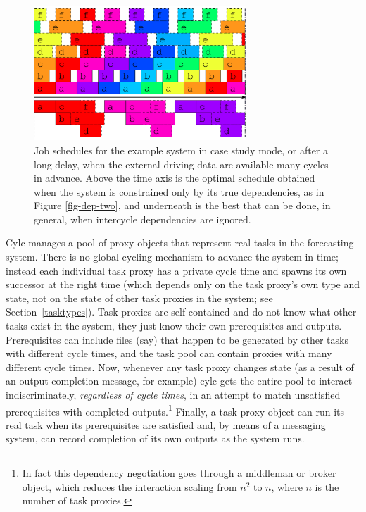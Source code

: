 \documentclass[11pt,a4paper]{article}
\begin{document}
\begin{figure} \label{fig-time-two}
    \begin{center} 
        \includegraphics[width=8cm]{inkscape-svg/timeline-two}
    \end{center} 
    \caption{\small Job schedules for the example system in case study
    mode, or after a long delay, when the external driving data are
    available many cycles in advance. Above the time axis is the optimal
    schedule obtained when the system is constrained only by its true
    dependencies, as in Figure \ref{fig-dep-two}, and underneath is
    the best that can be done, in general, when intercycle dependencies
    are ignored.} 
\end{figure} 

Cylc manages a pool of proxy objects that represent real tasks in the
forecasting system. There is no global cycling mechanism to advance the
system in time; instead each individual task proxy has a private cycle
time and spawns its own successor at the right time (which depends only
on the task proxy's own type and state, not on the state of other task
proxies in the system; see Section~\ref{tasktypes}). Task proxies
are self-contained and do not know what other tasks exist in the system,
they just know their own prerequisites and outputs.  Prerequisites can
include files (say) that happen to be generated by other tasks with
different cycle times, and the task pool can contain proxies with many
different cycle times.  Now, whenever any task proxy changes state (as a
result of an output completion message, for example) cylc gets the
entire pool to interact indiscriminately, {\em regardless of cycle
times}, in an attempt to match unsatisfied prerequisites with completed
outputs.\footnote{In fact this dependency negotiation goes through a
middleman or broker object, which reduces the interaction scaling
from $n^2$ to $n$, where $n$ is the number of task proxies.} Finally, a
task proxy object can run its real task when its prerequisites are
satisfied and, by means of a messaging system, can record completion of
its own outputs as the system runs. 
\end{document}
